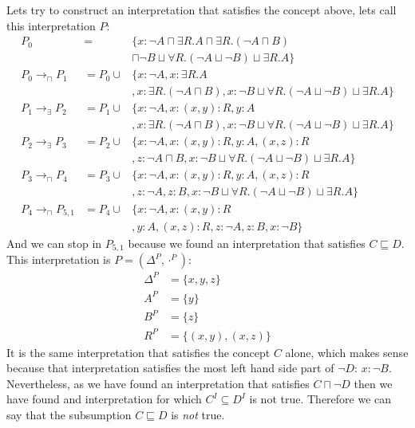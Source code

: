 \documentclass[a4paper,12pt]{article}
\begin{document}
Lets try to construct an interpretation that satisfies the concept above, lets
call this interpretation $P$:
\begin{eqnarray*}
P_0 &=& \{ x : \neg A \sqcap \exists R.A \sqcap \exists R.(\neg A \sqcap B)\\
    & &  \sqcap \neg B \sqcup
         \forall R.(\neg A \sqcup \neg B) \sqcup \exists R.A\}\\
P_0 \to_\sqcap P_1 &= P_0 \cup& \{ x : \neg A, x : \exists R.A\\
                              & &, x : \exists R.(\neg A \sqcap B)
                                 , x : \neg B \sqcup
                                       \forall R.(\neg A \sqcup \neg B)
                                       \sqcup \exists R.A\}\\
P_1 \to_\exists P_2 &= P_1 \cup& \{ x : \neg A, x : (x,y) : R, y : A\\
                               & &, x : \exists R.(\neg A \sqcap B)
                                  , x : \neg B \sqcup
                                        \forall R.(\neg A \sqcup \neg B)
                                        \sqcup \exists R.A\}\\
P_2 \to_\exists P_3 &= P_2 \cup& \{ x : \neg A
                                  , x : (x,y) : R, y : A, (x,z) : R\\
                               & &, z : \neg A \sqcap B
                                  , x : \neg B \sqcup
                                        \forall R.(\neg A \sqcup \neg B)
                                        \sqcup \exists R.A\}\\
P_3 \to_\sqcap P_4 &= P_3 \cup& \{ x : \neg A
                                 , x : (x,y) : R, y : A , (x,z) : R\\
                              & &, z : \neg A, z : B
                                 , x : \neg B \sqcup
                                       \forall R.(\neg A \sqcup \neg B)
                                       \sqcup \exists R.A\}\\
P_4 \to_\sqcap P_{5,1} &= P_4 \cup& \{ x : \neg A , x : (x,y) : R\\
                                  & &, y : A , (x,z) : R
                                     , z : \neg A, z : B, x : \neg B \}
\end{eqnarray*}
And we can stop in $ P_{5,1} $ because we found an interpretation that
satisfies $ C \sqsubseteq D $.  This interpretation is $ P = (\Delta^P,
\cdot^P) $:
\begin{align*}
\Delta^P &= \{x,y,z\}\\
     A^P &= \{y\}\\
     B^P &= \{z\}\\
     R^P &= \{(x,y),(x,z)\}
\end{align*}
It is the same interpretation that satisfies the concept $C$ alone, which makes
sense because that interpretation satisfies the most left hand side part of
$\neg D$: $x : \neg B$.  Nevertheless, as we have found an interpretation that
satisfies $ C \sqcap \neg D $ then we have found and interpretation for which $
C^I \subseteq D^I $ is not true.  Therefore we can say that the subsumption $ C
\sqsubseteq D $ is \emph{not} true.
\end{document}
